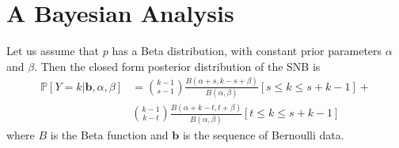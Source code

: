 \documentclass[12pt]{article}         %
\begin{document}


\section{A Bayesian Analysis}



Let us assume that $p$ has a Beta distribution, with constant prior 
parameters $\alpha$ and $\beta$. Then the closed form 
posterior distribution of the SNB is
\begin{align}
\mathbb{P} \left[Y = k | \mathbf{b}, \alpha, \beta \right] &= 
  {k-1 \choose s-1} \frac{B\left(\alpha+s, k-s+\beta \right)}{B(\alpha, \beta)} 
  [s \leq k \leq s+k-1] + \nonumber \\
  & {k-1 \choose k-t} 
  \frac{B\left(\alpha + k - t, t+\beta\right)}{B(\alpha, \beta)} 
  [t \leq k \leq s+k-1]
\end{align}
where $B$ is the Beta function and $\mathbf{b}$ is the sequence of Bernoulli data.
\end{document}
